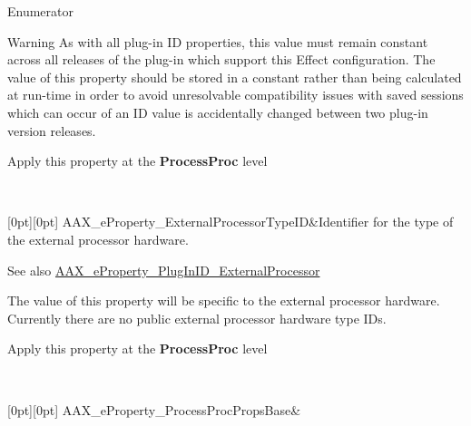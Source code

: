 \begin{DoxyEnumFields}{Enumerator}
\begin{DoxyWarning}{Warning}
As with all plug-\/in ID properties, this value must remain constant across all releases of the plug-\/in which support this Effect configuration. The value of this property should be stored in a constant rather than being calculated at run-\/time in order to avoid unresolvable compatibility issues with saved sessions which can occur of an ID value is accidentally changed between two plug-\/in version releases.
\end{DoxyWarning}
\begin{DoxyItemize}
\item Apply this property at the {\bfseries{Process\+Proc}} level \end{DoxyItemize}
\\
\hline

[0pt][0pt]{}\mbox{\label{a00662_a13e384f22825afd3db6d68395b79ce0dae51207358c4c8a00e6c5e26650ebeef2}} 
A\+A\+X\+\_\+e\+Property\+\_\+\+External\+Processor\+Type\+ID&Identifier for the type of the external processor hardware. \begin{DoxySeeAlso}{See also}
\mbox{\hyperlink{a00662_a13e384f22825afd3db6d68395b79ce0da2816852168f862575c687d28b48d0581}{A\+A\+X\+\_\+e\+Property\+\_\+\+Plug\+In\+I\+D\+\_\+\+External\+Processor}}
\end{DoxySeeAlso}
The value of this property will be specific to the external processor hardware. Currently there are no public external processor hardware type I\+Ds.

\begin{DoxyItemize}
\item Apply this property at the {\bfseries{Process\+Proc}} level \end{DoxyItemize}
\\
\hline

[0pt][0pt]{}\mbox{\label{a00662_a13e384f22825afd3db6d68395b79ce0da9a78445174f219014332c67af3b1eda6}} 
A\+A\+X\+\_\+e\+Property\+\_\+\+Process\+Proc\+Props\+Base&


\end{DoxyEnumFields}
